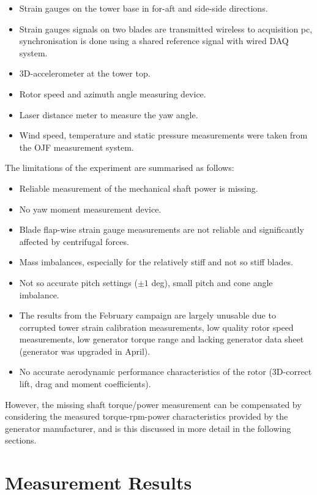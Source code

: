 \documentclass[a4paper]{jpconf}
\begin{document}
\begin{itemize}
	\item Strain gauges on the tower base in for-aft and side-side directions.
	\item Strain gauges signals on two blades are transmitted wireless to acquisition pc, synchronisation is done using a shared reference signal with wired DAQ system.
	\item 3D-accelerometer at the tower top.
	\item Rotor speed and azimuth angle measuring device.
	\item Laser distance meter to measure the yaw angle.
	\item Wind speed, temperature and static pressure measurements were taken from the  OJF measurement system.
\end{itemize}

The limitations of the experiment are summarised as follows:

\begin{itemize}
	\item Reliable measurement of the mechanical shaft power is missing.
	\item No yaw moment measurement device.
	\item Blade flap-wise strain gauge measurements are not reliable and significantly affected by centrifugal forces.
	\item Mass imbalances, especially for the relatively stiff and not so stiff blades.
	\item Not so accurate pitch settings ($\pm 1$ deg), small pitch and cone angle imbalance.
	\item The results from the February campaign are largely unusable due to corrupted tower strain calibration measurements, low quality rotor speed measurements, low generator torque range and lacking generator data sheet (generator was upgraded in April).
	\item No accurate aerodynamic performance characteristics of the rotor (3D-correct lift, drag and moment coefficients).
\end{itemize}

However, the missing shaft torque/power measurement can be compensated by considering the measured torque-rpm-power characteristics provided by the generator manufacturer, and is this discussed in more detail in the following sections.


\section{Measurement Results}
\end{document}
